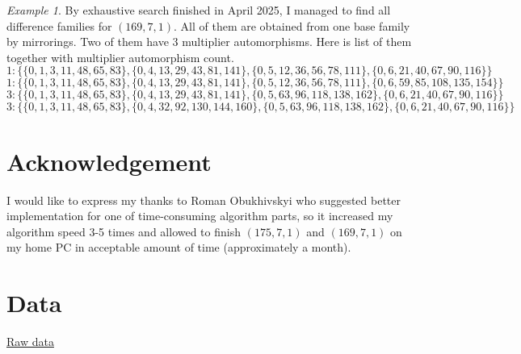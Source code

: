 \documentclass{amsart}
\theoremstyle{plain}
\theoremstyle{definition}
\theoremstyle{remark}
\newtheorem{example}{Example}[section]
\begin{document}
\begin{example} By exhaustive search finished in April 2025, I managed to find all difference families for $(169,7,1)$. All of them are obtained from one base family by mirrorings. Two of them have 3 multiplier automorphisms. Here is list of them together with multiplier automorphism count.
$$1: \{\{0, 1, 3, 11, 48, 65, 83\}, \{0, 4, 13, 29, 43, 81, 141\}, \{0, 5, 12, 36, 56, 78, 111\}, \{0, 6, 21, 40, 67, 90, 116\}\}$$
$$1: \{\{0, 1, 3, 11, 48, 65, 83\}, \{0, 4, 13, 29, 43, 81, 141\}, \{0, 5, 12, 36, 56, 78, 111\}, \{0, 6, 59, 85, 108, 135, 154\}\}$$
$$3: \{\{0, 1, 3, 11, 48, 65, 83\}, \{0, 4, 13, 29, 43, 81, 141\}, \{0, 5, 63, 96, 118, 138, 162\}, \{0, 6, 21, 40, 67, 90, 116\}\}$$
$$3: \{\{0, 1, 3, 11, 48, 65, 83\}, \{0, 4, 32, 92, 130, 144, 160\}, \{0, 5, 63, 96, 118, 138, 162\}, \{0, 6, 21, 40, 67, 90, 116\}\}$$
\end{example}

\section{Acknowledgement}

I would like to express my thanks to Roman Obukhivskyi who suggested better implementation for one of time-consuming algorithm parts, so it increased my algorithm speed 3-5 times and allowed to finish $(175,7,1)$ and $(169,7,1)$ on my home PC in acceptable amount of time (approximately a month).

\section{Data}

\href{data/151-6.txt}{Raw data}
\end{document}
